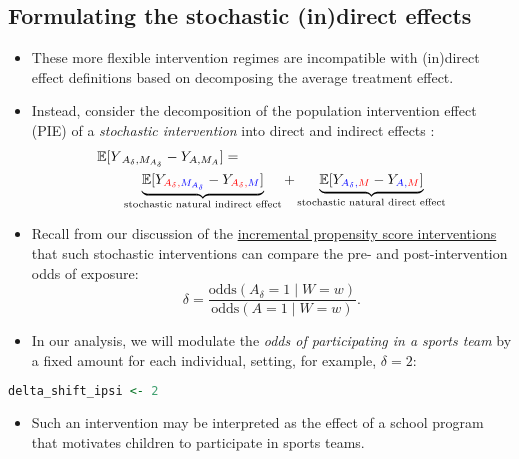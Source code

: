 \documentclass[
  12pt,
]{book}
\providecommand{\tightlist}{%
  \setlength{\itemsep}{0pt}\setlength{\parskip}{0pt}}
\theoremstyle{definition}
\theoremstyle{definition}
\theoremstyle{definition}
\newcommand{\E}{\mathbb{E}}
\newcommand{\1}{\mathbbm{1}}
\begin{document}
\hypertarget{formulating-the-stochastic-indirect-effects}{%
\subsection{Formulating the stochastic (in)direct effects}\label{formulating-the-stochastic-indirect-effects}}

\begin{itemize}
\tightlist
\item
  These more flexible intervention regimes are incompatible with (in)direct
  effect definitions based on decomposing the average treatment effect.
\item
  Instead, consider the decomposition of the population intervention effect
  (PIE) of a \emph{stochastic intervention} into direct and indirect effects
  \citep{diaz2020causal}:
  \begin{align*}
  \E[Y&_{A_\delta,M_{A_\delta}} - Y_{A,M_A}] = \\
  &\underbrace{\E[Y_{\color{red}{A_\delta},\color{blue}{M_{A_\delta}}} -
    Y_{\color{red}{A_\delta},\color{blue}{M}}]}_{\text{stochastic natural indirect effect}} +
    \underbrace{\E[Y_{\color{blue}{A_\delta},\color{red}{M}} -
    Y_{\color{blue}{A},\color{red}{M}}]}_{\text{stochastic natural direct effect}}
  \end{align*}
\item
  Recall from our discussion of the \protect\hyperlink{ipsi}{incremental propensity score
  interventions} \citep{kennedy2018nonparametric} that such stochastic
  interventions can compare the pre- and post-intervention odds of exposure:
  \begin{equation*}
  \delta = \frac{\text{odds}(A_\delta = 1\mid W=w)}
  {\text{odds}(A = 1\mid W=w)}.
  \end{equation*}
\item
  In our analysis, we will modulate the \emph{odds of participating in a sports
  team} by a fixed amount for each individual, setting, for example,
  \(\delta = 2\):
\end{itemize}

\begin{lstlisting}[language=R]
delta_shift_ipsi <- 2
\end{lstlisting}

\begin{itemize}
\tightlist
\item
  Such an intervention may be interpreted as the effect of a school program that
  motivates children to participate in sports teams.
\end{itemize}
\end{document}

